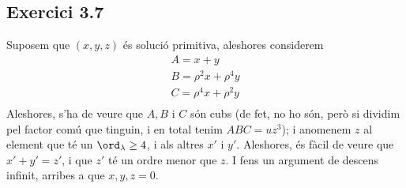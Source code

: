 \documentclass[11pt, a4paper]{article}
\begin{document}
    \subsection{Exercici 3.7}
    Suposem que $(x,y,z)$ és solució primitiva, aleshores considerem
    \[
        \begin{array}{l}
            A=x+y\\
            B=\rho^2x+\rho^4y\\
            C=\rho^4x+\rho^2y\\
        \end{array}
    \]
    Aleshores, s'ha de veure que $A,B$ i $C$ són cubs (de fet, no ho són, però si dividim pel factor comú que tinguin, i en total tenim $ABC=uz^3$); i anomenem $z$ al element que té un $\ord_\lambda\geq4$, i als altres $x'$ i $y'$. Aleshores, és fàcil de veure que $x'+y'=z'$, i que $z'$ té un ordre menor que $z$. I fens un argument de descens infinit, arribes a que $x,y,z=0$.
    

    \newpage
\end{document}
